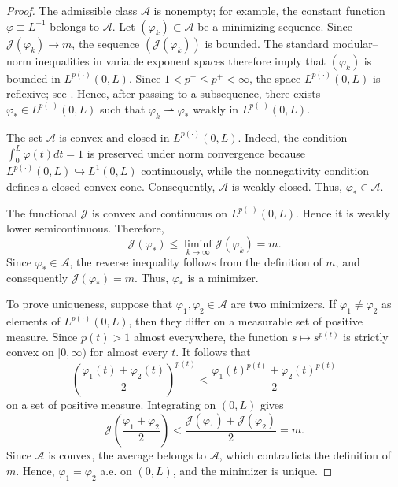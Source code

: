 \documentclass[12pt]{amsart}
\numberwithin{equation}{section}
\theoremstyle{plain}
\theoremstyle{definition}
\begin{document}
\begin{proof}
The admissible class $\mathcal A$ is nonempty; for example,
the constant function $\varphi\equiv L^{-1}$ belongs to $\mathcal A$.
Let $(\varphi_k)\subset\mathcal A$ be a minimizing sequence. Since
$\mathcal J(\varphi_k)\longrightarrow m$,
the sequence $(\mathcal J(\varphi_k))$ is bounded. The standard
modular--norm inequalities in variable exponent spaces therefore imply
that $(\varphi_k)$ is bounded in $L^{p(\cdot)}(0,L)$. Since
$1<p^-\le p^+<\infty$,
the space $L^{p(\cdot)}(0,L)$ is reflexive; see
\cite[Theorem~3.4.9]{Diening2011}. Hence, after passing to a subsequence,
there exists $\varphi_*\in L^{p(\cdot)}(0,L)$ such that $\varphi_k\rightharpoonup\varphi_*$ weakly in $L^{p(\cdot)}(0,L)$.

The set $\mathcal A$ is convex and closed in
$L^{p(\cdot)}(0,L)$. Indeed, the condition
$\int_0^L\varphi(t)dt=1$
is preserved under norm convergence because
$L^{p(\cdot)}(0,L)\hookrightarrow L^1(0,L)$ continuously, while the
nonnegativity condition defines a closed convex cone. Consequently,
$\mathcal A$ is weakly closed. Thus, $\varphi_*\in\mathcal A$.

The functional $\mathcal J$ is convex and continuous on
$L^{p(\cdot)}(0,L)$. Hence it is weakly lower semicontinuous. Therefore,
\begin{equation*}
\mathcal J(\varphi_*)
\le
\liminf_{k\to\infty}\mathcal J(\varphi_k)
=
m.
\end{equation*}
Since $\varphi_*\in\mathcal A$, the reverse inequality follows from the
definition of $m$, and consequently
$\mathcal J(\varphi_*)=m$.
Thus, $\varphi_*$ is a minimizer.

To prove uniqueness, suppose that
$\varphi_1,\varphi_2\in\mathcal A$ are two minimizers. If
$\varphi_1\ne\varphi_2$ as elements of $L^{p(\cdot)}(0,L)$, then they
differ on a measurable set of positive measure. Since
$p(t)>1$ almost everywhere, the function
$s\longmapsto s^{p(t)}$
is strictly convex on $[0,\infty)$ for almost every $t$. It follows
that
\begin{equation*}
\left(
\frac{\varphi_1(t)+\varphi_2(t)}{2}
\right)^{p(t)}
<
\frac{
\varphi_1(t)^{p(t)}
+
\varphi_2(t)^{p(t)}
}{2}
\end{equation*}
on a set of positive measure. Integrating on $(0,L)$ gives
\begin{equation*}
\mathcal J
\left(
\frac{\varphi_1+\varphi_2}{2}
\right)
<
\frac{\mathcal J(\varphi_1)+\mathcal J(\varphi_2)}{2}
=
m.
\end{equation*}
Since $\mathcal A$ is convex, the average belongs to $\mathcal A$,
which contradicts the definition of $m$. Hence, $\varphi_1=\varphi_2$ a.e. on $(0,L)$,
and the minimizer is unique.


\end{proof}
\end{document}
